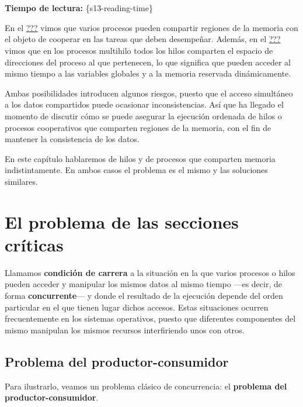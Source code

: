 \section{}

\textbf{Tiempo de lectura:} \{s13-reading-time\}

En el \hyperref[memoria_compartida]{???} vimos que varios procesos
pueden compartir regiones de la memoria con el objeto de cooperar en las
tareas que deben desempeñar. Además, en el \hyperref[hilos]{???} vimos
que en los procesos multihilo todos los hilos comparten el espacio de
direcciones del proceso al que pertenecen, lo que significa que pueden
acceder al mismo tiempo a las variables globales y a la memoria
reservada dinámicamente.

Ambas posibilidades introducen algunos riesgos, puesto que el acceso
simultáneo a los datos compartidos puede ocasionar inconsistencias. Así
que ha llegado el momento de discutir cómo se puede asegurar la
ejecución ordenada de hilos o procesos cooperativos que comparten
regiones de la memoria, con el fin de mantener la consistencia de los
datos.

En este capítulo hablaremos de hilos y de procesos que comparten memoria
indistintamente. En ambos casos el problema es el mismo y las soluciones
similares.

\section{El problema de las secciones
críticas}\label{_el_problema_de_las_secciones_cruxedticas}

Llamamos \textbf{{}condición de carrera} a la situación en la que varios
procesos o hilos pueden acceder y manipular los mismos datos al mismo
tiempo ---es decir, de forma \textbf{{}concurrente}--- y donde el
resultado de la ejecución depende del orden particular en el que tienen
lugar dichos accesos. Estas situaciones ocurren frecuentemente en los
sistemas operativos, puesto que diferentes componentes del mismo
manipulan los mismos recursos interfiriendo unos con otros.

\subsection{Problema del
productor-consumidor}\label{_problema_del_productor_consumidor}

Para ilustrarlo, veamos un problema clásico de concurrencia: el
\textbf{problema del {}productor-consumidor}.

